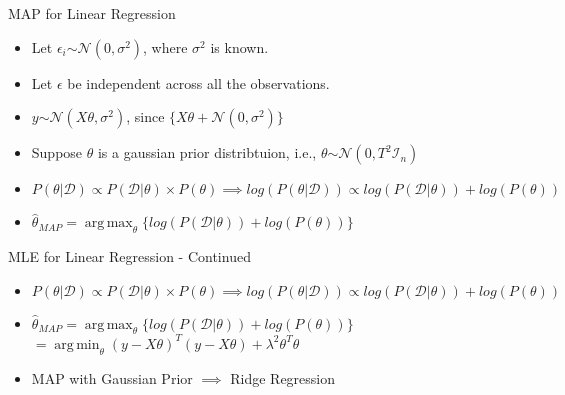 \documentclass{beamer}
\DeclareMathOperator*{\argmax}{arg\,max}
\DeclareMathOperator*{\argmin}{arg\,min}
\begin{document}
\begin{frame}{MAP for Linear Regression}

\begin{itemize}
    \item Let $\epsilon_i \stackrel{}{\sim} \mathcal{N}(0, \sigma^{2})$, where $\sigma^{2}$ is known.
    \item Let $\epsilon$ be independent across all the observations.
    \item $y \stackrel{}{\sim} \mathcal{N}(X\theta, \sigma^{2})$, since $\{ X\theta + \mathcal{N}(0, \sigma^{2})\}$ 
    \item Suppose $\theta$ is a gaussian prior distribtuion, i.e., $\theta \stackrel{}{\sim} \mathcal{N}(0, T^{2}\mathcal{I}_n)$
    \item $P(\theta | \mathcal{D}) \propto P(\mathcal{D} | \theta) \times P(\theta) \implies log(P(\theta | \mathcal{D})) \propto log(P(\mathcal{D} | \theta)) + log(P(\theta))$
    \item $\hat{\theta}_{MAP} = \argmax_\theta \{ log(P(\mathcal{D} | \theta)) + log(P(\theta)) \}$
\end{itemize}

    
\end{frame}
\begin{frame}{MLE for Linear Regression - Continued}
\begin{itemize}
    \item $P(\theta | \mathcal{D}) \propto P(\mathcal{D} | \theta) \times P(\theta) \implies log(P(\theta | \mathcal{D})) \propto log(P(\mathcal{D} | \theta)) + log(P(\theta))$
    \item $\hat{\theta}_{MAP} = \argmax_\theta \{ log(P(\mathcal{D} | \theta)) + log(P(\theta)) \}$  $ = \argmin_{\theta} (y - X\theta)^{T}(y - X\theta) + \lambda^{2}\theta^{T}\theta$
\item MAP with Gaussian Prior $\implies$ Ridge Regression
\end{itemize}


    
\end{frame}
\end{document}
